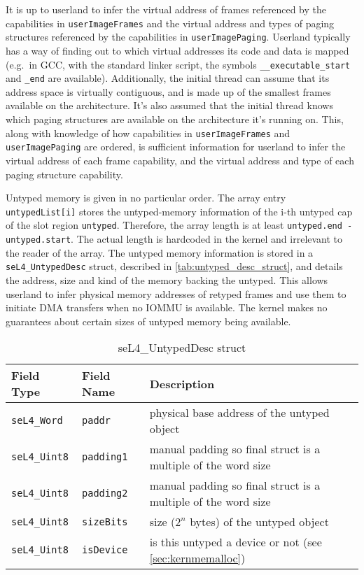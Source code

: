 It is up to userland to infer the virtual address of frames referenced by
the capabilities in \texttt{userImageFrames} and the virtual address and
types of paging structures
referenced by the capabilities in \texttt{userImagePaging}.
Userland typically has a way of finding out to which virtual addresses its
code and data is mapped (e.g.\ in GCC, with the standard linker script, the
symbols \texttt{\_\_executable\_start} and \texttt{\_end} are available).
Additionally, the initial thread can assume that its address space is virtually
contiguous, and is made up of the smallest frames available on the architecture.
It's also assumed that the initial thread knows which paging structures are
available on the architecture it's running on.
This, along with knowledge of how capabilities in \texttt{userImageFrames} and
\texttt{userImagePaging} are ordered, is sufficient information for userland to infer
the virtual address of each
frame capability, and the virtual address and type of each paging structure capability.

Untyped memory is given in no particular order. The array entry
\texttt{untypedList[i]} stores the untyped-memory information of
the i-th untyped cap of the slot region \texttt{untyped}. Therefore, the array
length is at least \texttt{untyped.end - untyped.start}. The actual length is
hardcoded in the kernel and irrelevant to the reader of the array. The untyped
memory information is stored in a \texttt{seL4\_UntypedDesc} struct, described
in \autoref{tab:untyped_desc_struct}, and details the address, size and kind of
the memory backing the untyped. This allows userland to infer physical memory
addresses of retyped frames and use them to initiate DMA transfers when no
IOMMU is available. The kernel makes no guarantees about certain sizes of untyped
memory being available.

\begin{table}[htb]
  \begin{center}
    \caption{seL4\_UntypedDesc struct}
    \label{tab:untyped_desc_struct}
    \begin{tabular}{lll}
      \toprule
      Field Type & Field Name & Description \\
      \midrule
      \texttt{seL4\_Word}  & \texttt{paddr}    & physical base address of the untyped object \\
      \texttt{seL4\_Uint8} & \texttt{padding1} & manual padding so final struct is a multiple of the word size \\
      \texttt{seL4\_Uint8} & \texttt{padding2} & manual padding so final struct is a multiple of the word size \\
      \texttt{seL4\_Uint8} & \texttt{sizeBits} & size ($2^n$ bytes) of the untyped object \\
      \texttt{seL4\_Uint8} & \texttt{isDevice} & is this untyped a device or not (see \autoref{sec:kernmemalloc}) \\
      \bottomrule
    \end{tabular}
  \end{center}
\end{table}

